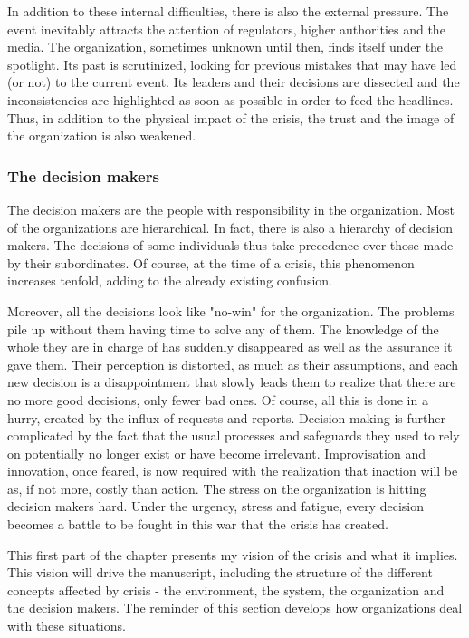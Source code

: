 In addition to these internal difficulties, there is also the external pressure.
The event inevitably attracts the attention of regulators, higher authorities and the media.
The organization, sometimes unknown until then, finds itself under the spotlight.
Its past is scrutinized, looking for previous mistakes that may have led (or not) to the current event.
Its leaders and their decisions are dissected and the inconsistencies are highlighted as soon as possible in order to feed the headlines.
Thus, in addition to the physical impact of the crisis, the trust and the image of the organization is also weakened.

\subsubsection{The decision makers}
The decision makers are the people with responsibility in the organization.
Most of the organizations are hierarchical.
In fact, there is also a hierarchy of decision makers.
The decisions of some individuals thus take precedence over those made by their subordinates.
Of course, at the time of a crisis, this phenomenon increases tenfold, adding to the already existing confusion.

Moreover, all the decisions look like "no-win" for the organization.
The problems pile up without them having time to solve any of them.
The knowledge of the whole they are in charge of has suddenly disappeared as well as the assurance it gave them.
Their perception is distorted, as much as their assumptions, and each new decision is a disappointment that slowly leads them to realize that there are no more good decisions, only fewer bad ones.
Of course, all this is done in a hurry, created by the influx of requests and reports.
Decision making is further complicated by the fact that the usual processes and safeguards they used to rely on potentially no longer exist or have become irrelevant.
Improvisation and innovation, once feared, is now required with the realization that inaction will be as, if not more, costly than action.
The stress on the organization is hitting decision makers hard.
Under the urgency, stress and fatigue, every decision becomes a battle to be fought in this war that the crisis has created.

This first part of the chapter presents my vision of the crisis and what it implies.
This vision will drive the manuscript, including the structure of the different concepts affected by crisis - the environment, the system, the organization and the decision makers.
The reminder of this section develops how organizations deal with these situations.

